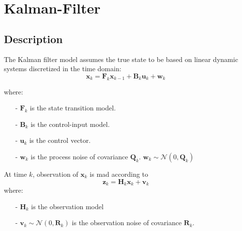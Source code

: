 \documentclass[twocolumn]{article}
\numberwithin{equation}{section}
\begin{document}
\newpage
\section{Kalman-Filter}	
	\subsection{Description}
The Kalman filter model assumes the true state to be based on linear dynamic systems discretized in the time domain:
 $$ \mathbf{x}_{k} = \mathbf{F}_{k} \mathbf{x}_{k-1} + \mathbf{B}_{k} \mathbf{u}_{k} + \mathbf{w}_{k}$$

where:
\begin{itemize}
	\item[-] $\mathbf{F}_{k}$ is the state transition model.
	\item[-] $\mathbf{B}_{k}$ is the control-input model.
	\item[-] $\mathbf{u}_{k}$ is the control vector.
	\item[-] $\mathbf{w}_{k}$ is the process noise of covariance $\mathbf{Q}_k$. $\mathbf{w}_{k} \sim \mathcal{N}(0, \mathbf{Q}_k)$ 
\end{itemize}

At time $k$, observation of $\mathbf{x}_k$ is mad according to
$$\mathbf{z}_k = \mathbf{H}_{k} \mathbf{x}_k + \mathbf{v}_k$$
where:
\begin{itemize}
	\item[-] $\mathbf{H}_{k}$ is the observation model
	\item[-] $\mathbf{v}_{k} \sim \mathcal{N}(0, \mathbf{R}_k)$ is the observation noise of covariance $\mathbf{R}_k$. 
\end{itemize}
\end{document}
